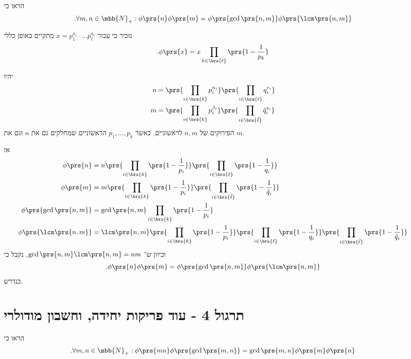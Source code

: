 \documentclass[a4paper,10pt,twoside,openany]{book}
\begin{document}
\begin{exercisechap}
הראו כי
\[\text{.} \forall m,n \in \mbb{N}_+ : \phi\prs{n} \phi\prs{m} = \phi\prs{\gcd\prs{n,m}} \phi\prs{\lcm\prs{n,m}}\]
\end{exercisechap}

\begin{solution}
נזכיר כי עבור
$x = p_1^{a_1} \cdot \ldots p_{\ell}^{a_{\ell}}$
מתקיים באופן כללי
\[\text{.} \phi\prs{x} = x \prod_{k \in \brs{\ell}} \prs{1 - \frac{1}{p_k}}\]

יהיו
\begin{align*}
n &= \prs{\prod_{i \in \brs{k}} p_i^{\alpha_i}} \prs{\prod_{i \in \brs{\ell}} q_i^{r_i}} \\
m &= \prs{\prod_{i \in \brs{k}} p_i^{\beta_i}} \prs{\prod_{i \in \brs{\tilde{\ell}}} \tilde{q}_i^{s_i}}
\end{align*}
הפירוקים של
$n,m$
לראשוניים, כאשר
$p_1, \ldots, p_k$
הראשוניים שמחלקים גם את
$n$
וגם את
$m$.

אז
\begin{align*}
\phi\prs{n} &= n \prs{\prod_{i \in \brs{k}} \prs{1 - \frac{1}{p_i}}} \prs{\prod_{i \in \brs{\ell}} \prs{1 - \frac{1}{q_i}}}
\\
\phi\prs{m} &= m  \prs{\prod_{i \in \brs{k}} \prs{1 - \frac{1}{p_i}}} \prs{\prod_{i \in \brs{\tilde{\ell}}} \prs{1 - \frac{1}{\tilde{q}_i}}}
\\
\phi\prs{\gcd\prs{n,m}} &= \gcd\prs{n,m} \prod_{i \in \brs{k}} \prs{1 - \frac{1}{p_i}}
\\
\phi\prs{\lcm\prs{n,m}} &= \lcm\prs{n,m} \prs{\prod_{i \in \brs{k}} \prs{1 - \frac{1}{p_i}}} \prs{\prod_{i \in \brs{\ell}} \prs{1 - \frac{1}{q_i}}} \prs{\prod_{i \in \brs{\tilde{\ell}}} \prs{1 - \frac{1}{\tilde{q}_i}}}
\end{align*}
וכיוון ש־%
$\gcd\prs{n,m} \lcm\prs{n,m} = nm$,
נקבל כי
\[\text{,}\phi\prs{n} \phi\prs{m} = \phi\prs{\gcd\prs{n,m}} \phi\prs{\lcm\prs{n,m}}\]
כנדרש.
\end{solution}

\chapter{תרגול 4 - עוד פריקות יחידה, וחשבון מודולרי}

\begin{exercisechap}
הראו כי
\[\text{.} \forall m,n \in \mbb{N}_+ : \phi\prs{mn} \phi\prs{\gcd\prs{m,n}} = \gcd\prs{m,n} \phi\prs{m} \phi\prs{n}\]
\end{exercisechap}
\end{document}
